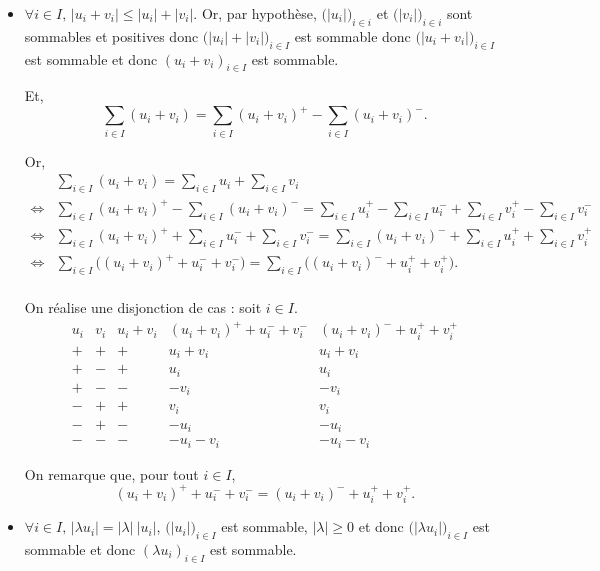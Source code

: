 \begin{prv}
	\begin{itemize}
		\item $\forall i \in I,\,\left| u_i + v_i \right| \le |u_i| + |v_i|$. Or, par hypothèse, $\big(|u_i|\big)_{i \in i}$ et $\big(|v_i|\big)_{i \in i}$ sont sommables et positives donc $\big(|u_i|+|v_i|\big)_{i \in I}$ est sommable donc $\big(|u_i + v_i|\big)_{i \in I}$ est sommable et donc $(u_i + v_i)_{i\in I}$ est sommable.
			
			Et,
			\[
				\sum_{i \in I}(u_i + v_i) = \sum_{i \in I}(u_i+v_i)^{+} - \sum_{i \in I}(u_i + v_i)^-
			.\]

			Or,
			\begin{align*}
				&\sum_{i \in I}(u_i + v_i) = \sum_{i \in I} u_i + \sum_{i \in I} v_i \\
				\iff& \sum_{i \in I} (u_i + v_i)^+ - \sum_{i \in I} (u_i + v_i)^-= \sum_{i \in I} u_i^+ - \sum_{i \in I} u_i^- + \sum_{i \in I} v_i^+ - \sum_{i \in I} v_i^-\\
				\iff& \sum_{i \in I}(u_i + v_i)^+ + \sum_{i \in I}u_i^- + \sum_{i \in I} v_i^-= \sum_{i \in I} (u_i + v_i)^- + \sum_{i \in I} u_i^+ + \sum_{i \in I} v_i^+\\
				\iff& \sum_{i \in I}\big((u_i + v_i)^+ + u_i^- + v_i^-\big) = \sum_{i \in I}\big((u_i + v_i)^- + u_i^+ + v_i^+\big).\\
			\end{align*}

			On réalise une disjonction de cas : soit $i \in I$.
			\[
				\begin{array}{c|c|c|c|c}
					u_i & v_i & u_i + v_i & (u_i + v_i)^+ + u_i^- + v_i^- & (u_i + v_i)^- + u_i^+ + v_i^+\\[1mm] \hline
					+&+&+&u_i + v_i & u_i + v_i\\
					+&-&+&u_i&u_i\\
					+&-&-&-v_i&-v_i\\
					-&+&+&v_i&v_i\\
					-&+&-&-u_i&-u_i\\
					-&-&-&-u_i-v_i&-u_i-v_i
				\end{array}
			\]

			On remarque que, pour tout $i \in I$, \[
				(u_i + v_i)^+ + u_i^- + v_i^- = (u_i + v_i)^- + u_i^+ + v_i^+
			.\]
		\item $\forall i \in I,\,|\lambda u_i| = |\lambda|\:|u_i|$, $\big(|u_i|\big)_{i \in I}$ est sommable, $|\lambda| \ge 0$ et donc $\big(|\lambda u_i|\big)_{i \in I}$ est sommable et donc $(\lambda u_i)_{i \in I}$ est sommable.


\end{itemize}
\end{prv}
